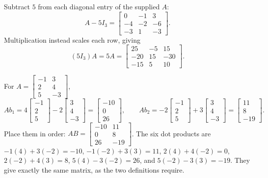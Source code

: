Subtract $5$ from each diagonal entry of the supplied $A$:
\[
 A-5I_3=\begin{bmatrix}0&-1&3\\-4&-2&-6\\-3&1&-3\end{bmatrix}.
\]
Multiplication instead scales each row, giving
\[
 (5I_3)A=5A=\begin{bmatrix}25&-5&15\\-20&15&-30\\-15&5&10\end{bmatrix}.
\]

For $A=\begin{bmatrix}-1&3\\2&4\\5&-3\end{bmatrix}$,
\[
 Ab_1=4\begin{bmatrix}-1\\2\\5\end{bmatrix}
       -2\begin{bmatrix}3\\4\\-3\end{bmatrix}
       =\begin{bmatrix}-10\\0\\26\end{bmatrix},\qquad
 Ab_2=-2\begin{bmatrix}-1\\2\\5\end{bmatrix}
       +3\begin{bmatrix}3\\4\\-3\end{bmatrix}
       =\begin{bmatrix}11\\8\\-19\end{bmatrix}.
\]
Place them in order: $AB=\begin{bmatrix}-10&11\\0&8\\26&-19\end{bmatrix}$.
The six dot products are
$-1(4)+3(-2)=-10$, $-1(-2)+3(3)=11$,
$2(4)+4(-2)=0$, $2(-2)+4(3)=8$,
$5(4)-3(-2)=26$, and $5(-2)-3(3)=-19$.
They give exactly the same matrix, as the two definitions require.


